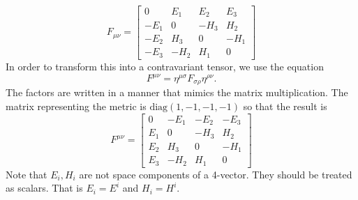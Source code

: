 \begin{enumerate}
\begin{equation}
F_{\mu\nu} = 
\begin{bmatrix}
0 & E_1 & E_2 & E_3 \\
-E_1 & 0 & -H_3 & H_2\\
-E_2 & H_3 & 0 & -H_1\\
-E_3 & -H_2 & H_1 & 0
\end{bmatrix}
\end{equation}
In order to transform this into a contravariant tensor, we use the equation
\begin{equation}\label{c3e76}
F^{\mu\nu} = \eta^{\mu\sigma}F_{\sigma\rho}\eta^{\rho\nu}.
\end{equation}
The factors are written in a manner that mimics the matrix multiplication. The 
matrix representing the metric is $\text{diag}(1, -1, -1, -1)$ so that the 
result is
\begin{equation}\label{c3e77}
F^{\mu\nu} = 
\begin{bmatrix}
0 & -E_1 & -E_2 & -E_3 \\
E_1 & 0 & -H_3 & H_2\\
E_2 & H_3 & 0 & -H_1\\
E_3 & -H_2 & H_1 & 0
\end{bmatrix}
\end{equation}
Note that $E_i, H_i$ are not space components of a 4-vector. They should be 
treated as scalars. That is $E_i = E^i$ and $H_i = H^i$.



\end{enumerate}
